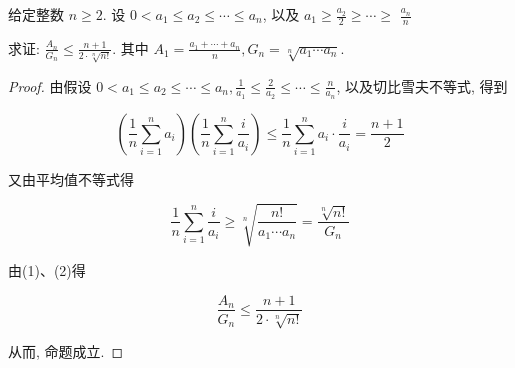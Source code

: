 \begin{example}
	给定整数 $n \geqslant 2$. 设 $0<a_{1} \leqslant a_{2} \leqslant \cdots \leqslant a_{n}$, 以及 $a_{1} \geqslant \frac{a_{2}}{2} \geqslant \cdots \geqslant$ $\frac{a_{n}}{n}$
	
	求证: $\frac{A_{n}}{G_{n}} \leqslant \frac{n+1}{2 \cdot \sqrt[n]{n!}}$. 其中 $A_{1}=\frac{a_{1}+\cdots+a_{n}}{n}, G_{n}=\sqrt[n]{a_{1} \cdots a_{n}}$.
\end{example}
\begin{proof}
	由假设 $0<a_{1} \leqslant a_{2} \leqslant \cdots \leqslant a_{n}, \frac{1}{a_{1}} \leqslant \frac{2}{a_{2}} \leqslant \cdots \leqslant \frac{n}{a_{n}}$, 以及切比雪夫不等式, 得到
	
	
	\begin{equation*}
	\left(\frac{1}{n} \sum_{i=1}^{n} a_{i}\right)\left(\frac{1}{n} \sum_{i=1}^{n} \frac{i}{a_{i}}\right) \leqslant \frac{1}{n} \sum_{i=1}^{n} a_{i} \cdot \frac{i}{a_{i}}=\frac{n+1}{2} \tag{1}
	\end{equation*}
	
	
	又由平均值不等式得
	
	
	\begin{equation*}
	\frac{1}{n} \sum_{i=1}^{n} \frac{i}{a_{i}} \geqslant \sqrt[n]{\frac{n!}{a_{1} \cdots a_{n}}}=\frac{\sqrt[n]{n!}}{G_{n}} \tag{2}
	\end{equation*}
	
	
	由(1)、(2)得
	
	$$
	\frac{A_{n}}{G_{n}} \leqslant \frac{n+1}{2 \cdot \sqrt[n]{n!}}
	$$
	
	从而, 命题成立.
\end{proof}
